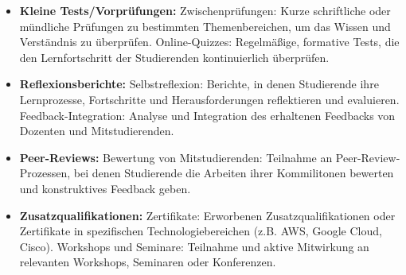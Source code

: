 \documentclass[conference]{IEEEtran}
\begin{document}
\begin{itemize}[leftmargin=*]
    \item \textbf{Kleine Tests/Vorprüfungen:}
    \newline Zwischenprüfungen: Kurze schriftliche oder mündliche Prüfungen zu bestimmten Themenbereichen, um das Wissen und Verständnis zu überprüfen.
    \newline Online-Quizzes: Regelmäßige, formative Tests, die den Lernfortschritt der Studierenden kontinuierlich überprüfen.

    \item \textbf{Reflexionsberichte:}
    \newline Selbstreflexion: Berichte, in denen Studierende ihre Lernprozesse, Fortschritte und Herausforderungen reflektieren und evaluieren.
    \newline Feedback-Integration: Analyse und Integration des erhaltenen Feedbacks von Dozenten und Mitstudierenden.

    \item \textbf{Peer-Reviews:}
    \newline Bewertung von Mitstudierenden: Teilnahme an Peer-Review-Prozessen, bei denen Studierende die Arbeiten ihrer Kommilitonen bewerten und konstruktives Feedback geben.

    \item \textbf{Zusatzqualifikationen:}
    \newline Zertifikate: Erworbenen Zusatzqualifikationen oder Zertifikate in spezifischen Technologiebereichen (z.B. AWS, Google Cloud, Cisco).
    \newline Workshops und Seminare: Teilnahme und aktive Mitwirkung an relevanten Workshops, Seminaren oder Konferenzen.
\end{itemize}
\end{document}
